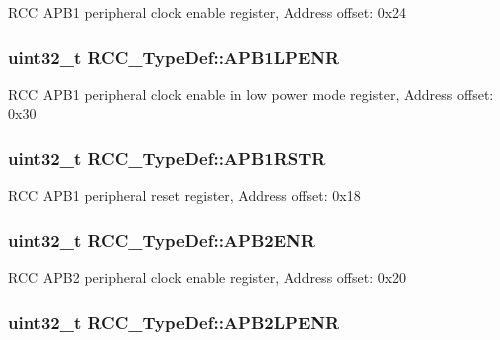 R\-C\-C A\-P\-B1 peripheral clock enable register, Address offset\-: 0x24 \hypertarget{struct_r_c_c___type_def_a5c8e710c40b642dcbf296201a7ecb2da}{
\subsubsection[{A\-P\-B1\-L\-P\-E\-N\-R}]{ uint32\-\_\-t R\-C\-C\-\_\-\-Type\-Def\-::\-A\-P\-B1\-L\-P\-E\-N\-R}}\label{struct_r_c_c___type_def_a5c8e710c40b642dcbf296201a7ecb2da}
R\-C\-C A\-P\-B1 peripheral clock enable in low power mode register, Address offset\-: 0x30 \hypertarget{struct_r_c_c___type_def_a600f4d6d592f43edb2fc653c5cba023a}{
\subsubsection[{A\-P\-B1\-R\-S\-T\-R}]{ uint32\-\_\-t R\-C\-C\-\_\-\-Type\-Def\-::\-A\-P\-B1\-R\-S\-T\-R}}\label{struct_r_c_c___type_def_a600f4d6d592f43edb2fc653c5cba023a}
R\-C\-C A\-P\-B1 peripheral reset register, Address offset\-: 0x18 \hypertarget{struct_r_c_c___type_def_a619b4c22f630a269dfd0c331f90f6868}{
\subsubsection[{A\-P\-B2\-E\-N\-R}]{ uint32\-\_\-t R\-C\-C\-\_\-\-Type\-Def\-::\-A\-P\-B2\-E\-N\-R}}\label{struct_r_c_c___type_def_a619b4c22f630a269dfd0c331f90f6868}
R\-C\-C A\-P\-B2 peripheral clock enable register, Address offset\-: 0x20 \hypertarget{struct_r_c_c___type_def_a7e46c65220f00a6858a5b35b74a37b51}{
\subsubsection[{A\-P\-B2\-L\-P\-E\-N\-R}]{ uint32\-\_\-t R\-C\-C\-\_\-\-Type\-Def\-::\-A\-P\-B2\-L\-P\-E\-N\-R}}\label{struct_r_c_c___type_def_a7e46c65220f00a6858a5b35b74a37b51}
